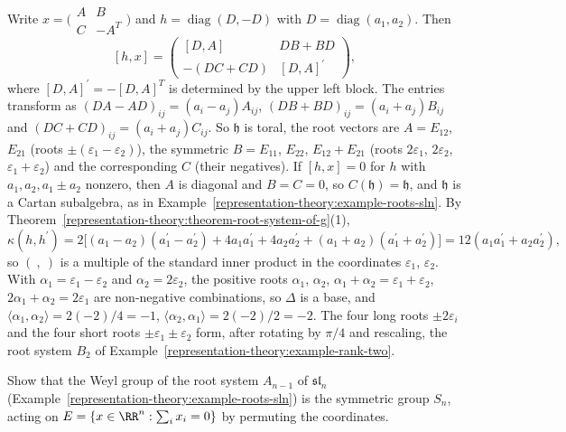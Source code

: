 \begin{solution}
Write $x = \bigl(\begin{smallmatrix}A & B\\ C & -A^T\end{smallmatrix}\bigr)$ and $h = \operatorname{diag}(D, -D)$ with $D = \operatorname{diag}(a_1, a_2)$. Then
\[
[h, x] = \begin{pmatrix}[D, A] & DB + BD\\ -(DC + CD) & [D, A]^{\prime}\end{pmatrix},
\]
where $[D, A]^{\prime} = -[D, A]^T$ is determined by the upper left block. The entries transform as $(DA - AD)_{ij} = (a_i - a_j)A_{ij}$, $(DB + BD)_{ij} = (a_i + a_j)B_{ij}$ and
$(DC + CD)_{ij} = (a_i + a_j)C_{ij}$. So $\mathfrak{h}$ is toral, the root vectors are $A = E_{12}$, $E_{21}$ (roots $\pm(\varepsilon_1 - \varepsilon_2)$), the symmetric $B = E_{11}$,
$E_{22}$, $E_{12} + E_{21}$ (roots $2\varepsilon_1$, $2\varepsilon_2$, $\varepsilon_1 + \varepsilon_2$) and the corresponding $C$ (their negatives). If $[h, x] = 0$ for $h$ with
$a_1, a_2, a_1 \pm a_2$ nonzero, then $A$ is diagonal and $B = C = 0$, so $C(\mathfrak{h}) = \mathfrak{h}$, and $\mathfrak{h}$ is a Cartan subalgebra, as in
Example~\ref{representation-theory:example-roots-sln}. By Theorem~\ref{representation-theory:theorem-root-system-of-g}(1),
\[
\kappa(h, h^{\prime}) = 2\bigl[(a_1 - a_2)(a_1^{\prime} - a_2^{\prime}) + 4a_1a_1^{\prime} + 4a_2a_2^{\prime} + (a_1 + a_2)(a_1^{\prime} + a_2^{\prime})\bigr] = 12(a_1a_1^{\prime} + a_2a_2^{\prime}),
\]
so $(\ ,\ )$ is a multiple of the standard inner product in the coordinates $\varepsilon_1$, $\varepsilon_2$. With $\alpha_1 = \varepsilon_1 - \varepsilon_2$ and $\alpha_2 = 2\varepsilon_2$,
the positive roots $\alpha_1$, $\alpha_2$, $\alpha_1 + \alpha_2 = \varepsilon_1 + \varepsilon_2$, $2\alpha_1 + \alpha_2 = 2\varepsilon_1$ are non-negative combinations, so $\Delta$ is a base, and
$\langle\alpha_1, \alpha_2\rangle = 2(-2)/4 = -1$, $\langle\alpha_2, \alpha_1\rangle = 2(-2)/2 = -2$. The four long roots $\pm2\varepsilon_i$ and the four short roots
$\pm\varepsilon_1 \pm \varepsilon_2$ form, after rotating by $\pi/4$ and rescaling, the root system $B_2$ of Example~\ref{representation-theory:example-rank-two}.
\end{solution}

\begin{exercise}\label{representation-theory:exercise-weyl-group-sln}
Show that the Weyl group of the root system $A_{n-1}$ of $\mathfrak{sl}_n$ (Example~\ref{representation-theory:example-roots-sln}) is the symmetric group $S_n$, acting on
$E = \{x \in \RR^n : \sum_ix_i = 0\}$ by permuting the coordinates.
\end{exercise}

